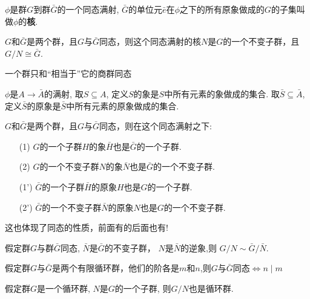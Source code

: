 \begin{Definition}[核]
$\phi$是群$G$到群$\bar{G}$的一个同态满射, $\bar{G}$的单位元$\bar{e}$在$\phi$之下的所有原象做成的$G$的子集叫做$\phi$的\textbf{核}.
\end{Definition}

\begin{Theorem}
$G$和$\bar{G}$是两个群，且$G$与$\bar{G}$同态，则这个同态满射的核$N$是$G$的一个不变子群，且$G/N \cong \bar{G}$.
\end{Theorem}

\begin{Remark}
一个群只和``相当于''它的商群同态
\end{Remark}

\begin{Definition}
$\phi$是$A \rightarrow \bar{A}$的满射, 取$S \subseteq A$, 定义$S$的象是$S$中所有元素的象做成的集合. 取$\bar{S} \subseteq \bar{A}$, 定义$\bar{S}$的原象是$\bar{S}$中所有元素的原象做成的集合.
\end{Definition}

\begin{Theorem}
$G$和$\bar{G}$是两个群，且$G$与$\bar{G}$同态，则在这个同态满射之下:
\begin{itemize}
\item[(1)] $G$的一个子群$H$的象$\bar{H}$也是$\bar{G}$的一个子群.
\item[(2)] $G$的一个不变子群$N$的象$\bar{N}$也是$\bar{G}$的一个不变子群.
\item[(1')] $\bar{G}$的一个子群$\bar{H}$的原象$H$也是$G$的一个子群.
\item[(2')] $\bar{G}$的一个不变子群$\bar{N}$的原象$N$也是$G$的一个不变子群.
\end{itemize}
\end{Theorem}

\begin{Remark}
这也体现了同态的性质，前面有的后面也有!
\end{Remark}

\begin{Proposition}
假定群$G$与群$\bar{G}$同态, $\bar{N}$是$\bar{G}$的不变子群， $N$是$\bar{N}$的逆象,则
$ G/N \sim \bar{G}/\bar{N} $.
\end{Proposition}

\begin{Proposition}
假定群$G$与$\bar{G}$是两个有限循环群，他们的阶各是$m$和$n$,则$G$与$\bar{G}$同态$\Leftrightarrow n \mid m$
\end{Proposition}

\begin{Proposition}
假定群$G$是一个循环群, $N$是$G$的一个子群, 则$G/N$也是循环群.
\end{Proposition}

